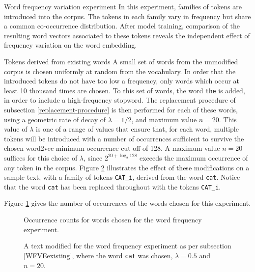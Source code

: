 \documentclass{article} %
\newcommand{\word}[1]{\texttt{#1}}
\begin{document}
\begin{section}{Word frequency variation experiment}\label{WFVE}
In this experiment, families of tokens are introduced into the corpus.
The tokens in each family vary in frequency but share a common co-occurrence distribution.
After model training, comparison of the resulting word vectors associated to these tokens reveals the independent effect of frequency variation on the word embedding.

\begin{subsection}{Tokens derived from existing words}\label{WFVEexisting}
A small set of words from the unmodified corpus is chosen uniformly at random from the vocabulary.
In order that the introduced tokens do not have too low a frequency, only words which occur at least 10 thousand times are chosen.
To this set of words, the word \word{the} is added, in order to include a high-frequency stopword.
The replacement procedure of subsection \ref{replacement-procedure} is then performed for each of these words, using a geometric rate of decay of $\lambda = 1/2$, and maximum value $n=20$.
This value of $\lambda$ is one of a range of values that ensure that, for each word, multiple tokens will be introduced with a number of occurrences sufficient to survive the chosen word2vec minimum occurrence cut-off of 128.  
A maximum value $n=20$ suffices for this choice of $\lambda$, since $2^{20 + \log_2{128}}$ exceeds the maximum occurrence of any token in the corpus. 
Figure \ref{fig:word-frequency-experiment-text-cat} illustrates the effect of these modifications on a sample text, with a family of tokens \word{CAT\_i}, derived from the word \word{cat}.
Notice that the word \word{cat} has been replaced throughout with the tokens \word{CAT\_i}.

Figure \ref{fig:word-frequency-counts} gives the number of occurrences of the words chosen for this experiment.

\begin{figure}\label{fig:word-frequency-counts}
	
	\caption{Occurrence counts for words chosen for the word frequency experiment. }
\end{figure}

\begin{figure}\label{fig:word-frequency-experiment-text-cat}
	\begin{mdframed}
	
	\end{mdframed}
	\caption{A text modified for the word frequency experiment as per subsection \ref{WFVEexisting}, where the
	word \word{cat} was chosen, $\lambda=0.5$ and $n=20$.}
\end{figure}


\end{subsection}
\end{section}
\end{document}
